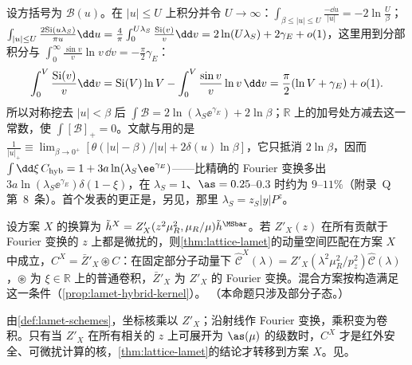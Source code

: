 \begin{example}[混合核的归一化]\label{ex:lamet-hybrid-normalization}
设方括号为 $\mathcal B(u)$。在 $|u|\le U$ 上积分并令 $U\to\infty$：$\int_{\beta\le|u|\le U}\frac{-\dd u}{|u|}=-2\ln\frac U\beta$；$\int_{|u|\le U}\frac{2{\rm Si}(u\lambda_S)}{\pi u}\dd u=\frac4\pi\int_0^{U\lambda_S}\frac{{\rm Si}(v)}v\dd v=2\ln(U\lambda_S)+2\gamma_E+o(1)$，这里用到分部积分与 $\int_0^\infty\frac{\sin v}v\ln v\,\dd v=-\frac\pi2\gamma_E$：
\[
\int_0^V\frac{{\rm Si}(v)}v\dd v={\rm Si}(V)\ln V-\int_0^V\frac{\sin v}v\ln v\,\dd v=\frac\pi2(\ln V+\gamma_E)+o(1).
\]
所以对称挖去 $|u|<\beta$ 后 $\int\mathcal B=2\ln(\lambda_S\ee^{\gamma_E})+2\ln\beta$；$\mathbb R$ 上的加号处方减去这一常数，使 $\int[\mathcal B]_+=0$。文献\cite[式~(33)--(34)]{Ji:2020brr}与\cite[式~(120)--(121)]{JiEtAl2021}用的是 $\frac1{|u|_+}\equiv\lim_{\beta\to0^+}[\theta(|u|-\beta)/|u|+2\delta(u)\ln\beta]$，它只抵消 $2\ln\beta$，因而 $\int\dd\xi\,C_{\rm hyb}=1+3a\ln(\lambda_S\ee^{\gamma_E})$——比精确的 Fourier 变换多出 $3a\ln(\lambda_S\ee^{\gamma_E})\delta(1-\xi)$，在 $\lambda_S=1$、$\as=0.25$–$0.3$ 时约为 $9$–$11\%$（附录~Q 第~8~条）。首个发表的更正是\cite[式~(35)]{Chou:2022drv}，另见\cite[式~(A.14)]{Su:2022fiu}，那里 $\lambda_S=z_S|y|P^z$。
\end{example}


\begin{proposition}\label{prop:lamet-scheme-validity}
设方案 $X$ 的换算为 $\tilde h^X=Z'_X(z^2\mu_R^2,\mu_R/\mu)\tilde h^{\MSbar}$。若 $Z'_X(z)$ 在所有贡献于 Fourier 变换的 $z$ 上都是微扰的，则\cref{thm:lattice-lamet}的动量空间匹配在方案 $X$ 中成立，$C^X=\bar Z'_X\circledast C$：在固定部分子动量下 $\hat{\mathcal C}^X(\lambda)=Z'_X(\lambda^2\mu_R^2/p_z^2)\hat{\mathcal C}(\lambda)$，$\circledast$ 为 $\xi\in\mathbb R$ 上的普通卷积，$\bar Z'_X$ 为 $Z'_X$ 的 Fourier 变换。混合方案按构造满足这一条件（\cref{prop:lamet-hybrid-kernel}）。
（本命题只涉及部分子态。）
\end{proposition}

\begin{proofsketch}
由\cref{def:lamet-schemes}，坐标核乘以 $Z'_X$；沿射线作 Fourier 变换，乘积变为卷积。只有当 $Z'_X$ 在所有相关的 $z$ 上可展开为 $\as(\mu)$ 的级数时，$C^X$ 才是红外安全、可微扰计算的核，\cref{thm:lattice-lamet}的结论才转移到方案 $X$。见\cite{JiEtAl2021,Ji:2020brr}。
\end{proofsketch}

